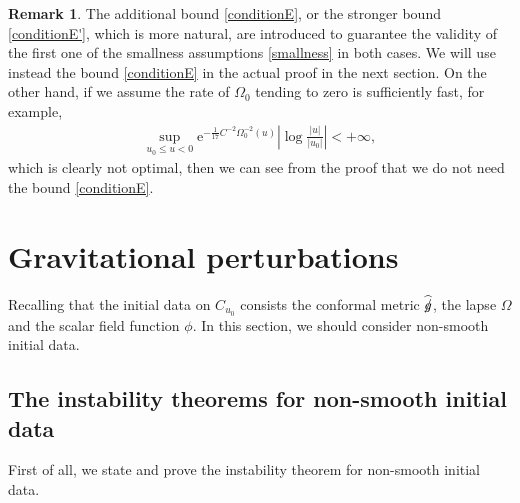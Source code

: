 \documentclass[11pt,reqno]{amsart}
\theoremstyle{definition}
\newtheorem{remark}{Remark}[section]
\numberwithin{equation}{section}
\def\ub{\underline{u}}
\def\gs{\mbox{$g \mkern -9mu /$}}
\begin{document}
\begin{remark}\label{remark-sufficientsingular}
The additional bound \eqref{conditionE}, or the stronger bound \eqref{conditionE'}, which is more natural, are introduced to guarantee the validity of the first one of the smallness assumptions \eqref{smallness} in both cases. We will use instead the bound \eqref{conditionE} in the actual proof in the next section. On the other hand, if we assume the rate of $\Omega_0$ tending to zero is sufficiently fast, for example,
\begin{align*}
\sup_{u_0\le u<0}\mathrm{e}^{-\frac{1}{17}C^{-2}\Omega_0^{-2}(u)}\left|\log\frac{|u|}{|u_0|}\right|<+\infty,
\end{align*}
which is clearly not optimal, then we can see from the proof that we do not need the bound \eqref{conditionE}. %
\end{remark}


\section{Gravitational perturbations}\label{proofofmaintheorem}

Recalling that the initial data on $C_{u_0}$ consists the conformal metric $\widehat{\gs}$, the lapse $\Omega$ and the scalar field function $\phi$. In this section, we should consider non-smooth initial data. 
\subsection{The instability theorems for non-smooth initial data}  First of all, we state and prove the instability theorem for non-smooth initial data.
\end{document}
